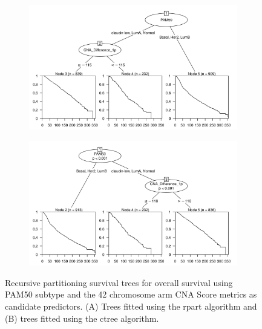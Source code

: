 \begin{figure}[!htb]
\centering

\vspace{0.5cm}

\begin{subfigure}{\textwidth}
\subcaption{}
\includegraphics[width=1\textwidth]{../figures/Appendices/Appendix_B/PA_PartyKit_Survival_Score_OS_PAM50.png}
\end{subfigure}

\vspace{2cm}

\begin{subfigure}{\textwidth}
\subcaption{}
\includegraphics[width=1\textwidth]{../figures/Appendices/Appendix_B/PA_Ctree_Survival_Score_OS_PAM50.png}
\end{subfigure}

\vspace{0.5cm}

\caption[Recursive partitioning survival trees for overall survival using PAM50 subtype and the 42 chromosome arm CNA Score metrics as candidate predictors.]{Recursive partitioning survival trees for overall survival using PAM50 subtype and the 42 chromosome arm CNA Score metrics as candidate predictors. (A) Trees fitted using the rpart algorithm and (B) trees fitted using the ctree algorithm.}
\end{figure}

